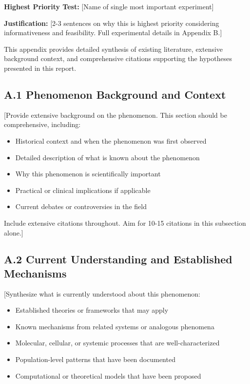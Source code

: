 \documentclass[11pt,letterpaper]{article}
\begin{document}
\vspace{0.3cm}

\textbf{Highest Priority Test:} [Name of single most important experiment]

\textbf{Justification:} [2-3 sentences on why this is highest priority considering informativeness and feasibility. Full experimental details in Appendix B.]

\newpage
\appendix


This appendix provides detailed synthesis of existing literature, extensive background context, and comprehensive citations supporting the hypotheses presented in this report.

\subsection*{A.1 Phenomenon Background and Context}

[Provide extensive background on the phenomenon. This section should be comprehensive, including:
\begin{itemize}
  \item Historical context and when the phenomenon was first observed
  \item Detailed description of what is known about the phenomenon
  \item Why this phenomenon is scientifically important
  \item Practical or clinical implications if applicable
  \item Current debates or controversies in the field
\end{itemize}

Include extensive citations throughout. Aim for 10-15 citations in this subsection alone.]

\subsection*{A.2 Current Understanding and Established Mechanisms}

[Synthesize what is currently understood about this phenomenon:
\begin{itemize}
  \item Established theories or frameworks that may apply
  \item Known mechanisms from related systems or analogous phenomena
  \item Molecular, cellular, or systemic processes that are well-characterized
  \item Population-level patterns that have been documented
  \item Computational or theoretical models that have been proposed
\end{itemize}
\end{document}
